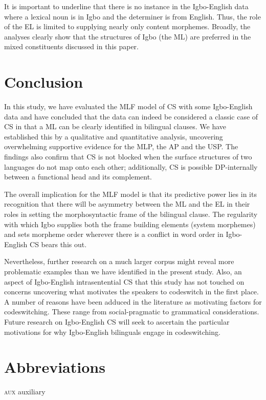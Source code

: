\documentclass[output=paper]{langsci/langscibook}
\begin{document}
It is important to underline that there is no instance in the Igbo-English data where a lexical noun is in Igbo and the determiner is from English. Thus, the role of the EL is limited to supplying nearly only content morphemes. Broadly, the analyses clearly show that the structures of Igbo (the ML) are preferred in the mixed constituents discussed in this paper.

\section{ Conclusion}

In this study, we have evaluated the MLF model of CS with some Igbo-English data and have concluded that the data can indeed be considered a classic case of CS in that a ML can be clearly identified in bilingual clauses. We have established this by a qualitative and quantitative analysis, uncovering overwhelming supportive evidence for the MLP, the AP and the USP. The findings also confirm that CS is not blocked when the surface structures of two languages do not map onto each other; additionally, CS is possible DP-internally between a functional head and its complement. 

The overall implication for the MLF model is that its predictive power lies in its recognition that there will be asymmetry between the ML and the EL in their roles in setting the morphosyntactic frame of the bilingual clause. The regularity with which Igbo supplies both the frame building elements (system morphemes) and sets morpheme order wherever there is a conflict in word order in Igbo-English CS bears this out. 

Nevertheless, further research on a much larger corpus might reveal more problematic examples than we have identified in the present study. Also, an aspect of Igbo-English intrasentential CS that this study has not touched on concerns uncovering what motivates the speakers to codeswitch in the first place. A number of reasons have been adduced in the literature as motivating factors for codeswitching. These range from social-pragmatic to grammatical considerations. Future research on Igbo-English CS will seek to ascertain the particular motivations for why Igbo-English bilinguals engage in codeswitching.

\section{ Abbreviations}

\textsc{aux}  auxiliary
\end{document}
